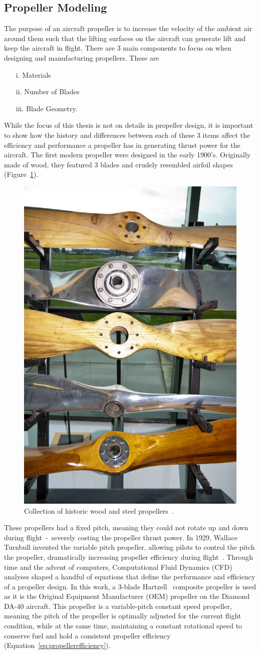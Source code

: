 \subsection{Propeller Modeling}
The purpose of an aircraft propeller is to increase the velocity of the ambient air around them such that the lifting surfaces on the aircraft can generate lift and keep the aircraft in flight. There are 3 main components to focus on when designing and manufacturing propellers. These are
\begin{itemize}
    \item[i.] Materials
    \item[ii.] Number of Blades
    \item[iii.] Blade Geometry.
\end{itemize}
While the focus of this thesis is not on details in propeller design, it is important to show how the history and differences between each of these 3 items affect the efficiency and performance a propeller has in generating thrust power for the aircraft. The first modern propeller were designed in the early 1900's. Originally made of wood, they featured 3 blades and crudely resembled airfoil shapes (Figure~\ref{fig:woodprops}).

\begin{figure}[!ht]\label{fig:woodprops}
    \centering
    \includegraphics[width=0.3\linewidth]{Figures/woodProps.jpg}
    \caption{Collection of historic wood and steel propellers~\cite{ianHowIdentifyHistoric2016}.}
\end{figure}

These propellers had a fixed pitch, meaning they could not rotate up and down during flight~-~severely costing the propeller thrust power. In 1929, Wallace Turnbull invented the variable pitch propeller, allowing pilots to control the pitch the propeller, dramatically increasing propeller efficiency during flight~\cite{ianShortHistoryAircraft2018}. Through time and the advent of computers, Computational Fluid Dynamics (CFD) analyses shaped a handful of equations that define the performance and efficiency of a propeller design. In this work, a 3-blade Hartzell~\cite{HartzellPropellerInc} composite propeller is used as it is the Original Equipment Manufacturer (OEM) propeller on the Diamond DA-40 aircraft. This propeller is a variable-pitch constant speed propeller, meaning the pitch of the propeller is optimally adjusted for the current flight condition, while at the same time, maintaining a constant rotational speed to conserve fuel and hold a consistent propeller efficiency (Equation~\ref{eq:propellerefficiency}).

